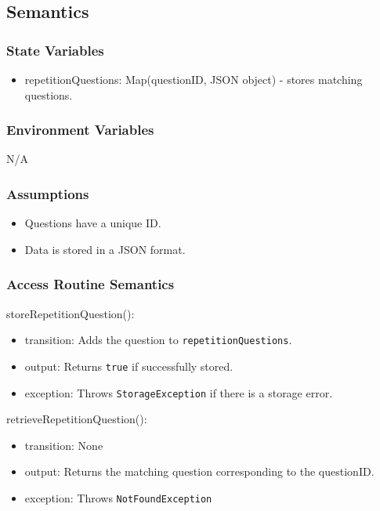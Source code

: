 \documentclass[12pt, titlepage]{article}
\begin{document}
\subsection{Semantics}

\subsubsection{State Variables}

\begin{itemize}
  \item repetitionQuestions: Map(questionID, JSON object) - stores matching questions.
\end{itemize}

\subsubsection{Environment Variables}

N/A

\subsubsection{Assumptions}

\begin{itemize}
  \item Questions have a unique ID.
  \item Data is stored in a JSON format.
\end{itemize}

\subsubsection{Access Routine Semantics}

\noindent storeRepetitionQuestion():
\begin{itemize}
  \item transition: Adds the question to \texttt{repetitionQuestions}.
  \item output: Returns \texttt{true} if successfully stored.
  \item exception: Throws \texttt{StorageException} if there is a storage error.
\end{itemize}

\noindent retrieveRepetitionQuestion():
\begin{itemize}
  \item transition: None
  \item output: Returns the matching question corresponding to the questionID.
  \item exception: Throws \texttt{NotFoundException}
\end{itemize}
\end{document}
